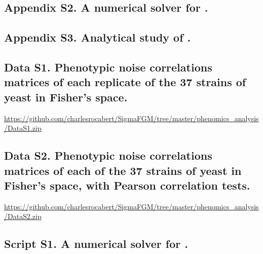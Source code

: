 

\newpage


\subsection{Appendix S2. A numerical solver for {\sigmaFGM}.}
\label{part1:AppendixS2}



\newpage


\subsection{Appendix S3. Analytical study of {\sigmaFGM}.}
\label{part1:AppendixS3}



\newpage


\subsection{Data S1. Phenotypic noise correlations matrices of each replicate of the 37 strains of yeast in Fisher's space.}
\label{part1:DataS1}

\href{https://github.com/charlesrocabert/SigmaFGM/tree/master/phenomics\_analysis/DataS1.zip}{https://github.com/charlesrocabert/SigmaFGM/tree/master/phenomics\_analysis/DataS1.zip}

\newpage


\subsection{Data S2. Phenotypic noise correlations matrices of each of the 37 strains of yeast in Fisher's space, with Pearson correlation tests.}
\label{part1:DataS2}

\href{https://github.com/charlesrocabert/SigmaFGM/tree/master/phenomics\_analysis/DataS1.zip}{https://github.com/charlesrocabert/SigmaFGM/tree/master/phenomics\_analysis/DataS2.zip}

\newpage


\subsection{Script S1. A numerical solver for {\sigmaFGM}.}
\label{part1:ScriptS1}

